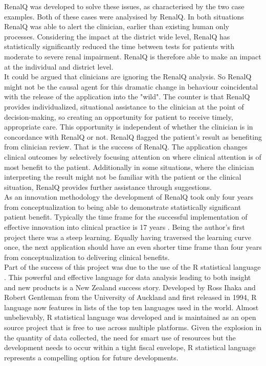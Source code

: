 \documentclass[11pt]{article}
\begin{document}
RenalQ was developed to solve these issues, as characterised by the two case examples. Both of these cases were analysised by RenalQ. In both situations RenalQ was able to alert the clinician, earlier than existing human only processes. Considering the impact at the district wide level, RenalQ has statistically significantly reduced the time between tests for patients with moderate to severe renal impairment. RenalQ is therefore able to make an impact at the individual and district level. \\

It could be argued that clinicians are ignoring the RenalQ analysis. So RenalQ might not be the causal agent for this dramatic change in behaviour coincidental with the release of the application into the "wild". The counter is that RenalQ provides individualized, situational assistance to the clinician at the point of decision-making, so creating an opportunity for patient to receive timely, appropriate care. This opportunity is independent of whether the clinician is in concordance with RenalQ or not. RenalQ flagged the patient's result as benefiting from clinician review. That is the success of RenalQ.  The application changes clinical outcomes by selectively focusing attention on where clinical attention is of most benefit to the patient.  Additionally in some situations, where the clinician interpreting the result might not be familiar with the patient or the clinical situation, RenalQ provides further assistance through suggestions. \\ 

As an innovation methodology the development of RenalQ took only four years from conceptualization to being able to demonstrate statistically significant patient benefit. Typically the time frame for the successful implementation of effective innovation into clinical practice is 17 years \citep{morris2011answer}. Being the author's first project there was a steep learning. Equally having traversed the learning curve once, the next application should have an even shorter time frame than four years from conceptualization to delivering clinical benefits. \\

Part of the success of this project was due to the use of the R statistical language \citep{rstat2013}. This powerful and effective language for data analysis leading to both insight and new products is a New Zealand success story. Developed by Ross Ihaka and Robert Gentleman from the University of Auckland and first released in 1994, R language now features in lists of the top ten languages used in the world. Almost unbelievably, R statistical language was developed and is maintained as an open source project that is free to use across multiple platforms. Given the explosion in the quantity of data collected, the need for smart use of resources but the development needs to occur within a tight fiscal envelope, R statistical language represents a compelling option for future developments. \\
\end{document}
